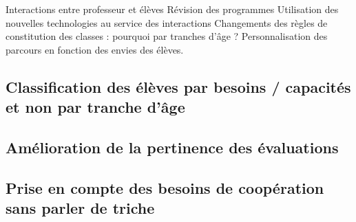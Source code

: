 Interactions entre professeur et élèves
Révision des programmes
Utilisation des nouvelles technologies au service des interactions
Changements des règles de constitution des classes : pourquoi par tranches d'âge ?
Personnalisation des parcours en fonction des envies des élèves.

\subsection{Classification des élèves par besoins / capacités  et non par tranche d'âge}
\subsection{Amélioration de la pertinence des évaluations}
\subsection{Prise en compte des besoins de coopération sans parler de triche}

